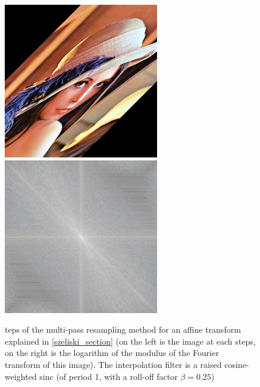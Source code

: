 \begin{figure}
{			{\includegraphics[scale=0.375]{decompoSzeliski_image_sortie.png}}
			{\includegraphics[scale=0.375]{decompoSzeliski_fourier_sortie.png}}
		}
		\caption{teps of the multi-pass resampling method for an affine transform explained in \ref{szeliski_section} (on the left is the image at each steps, on the right is the logarithm of the modulus of the Fourier transform of this image). The interpolation filter is a raised cosine-weighted sinc (of period 1, with a roll-off factor $\beta = 0.25$)}
		\label{experiments_decompoSzeliski}
	\end{figure}

